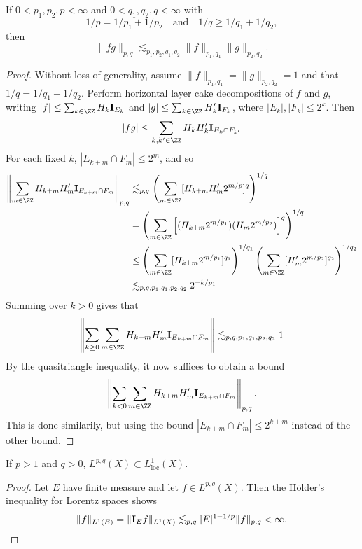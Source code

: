 \begin{theorem}
    If $0 < p_1,p_2,p < \infty$ and $0 < q_1,q_2,q < \infty$ with
    \[ 1/p = 1/p_1 + 1/p_2 \quad \text{and} \quad 1/q \geq 1/q_1 + 1/q_2, \]
    then
    \[ \| f g \|_{p,q} \lesssim_{p_1,p_2,q_1,q_2} \| f \|_{p_1,q_1} \| g \|_{p_2,q_2}. \]
\end{theorem}
\begin{proof}
    Without loss of generality, assume $\| f \|_{p_1,q_1} = \| g \|_{p_2, q_2} = 1$ and that $1/q = 1/q_1 + 1/q_2$. Perform horizontal layer cake decompositions of $f$ and $g$, writing $|f| \leq \sum_{k \in \ZZ} H_k \mathbf{I}_{E_k}$ and $|g| \leq \sum_{k \in \ZZ} H_k' \mathbf{I}_{F_k}$, where $|E_k|, |F_k| \leq 2^k$. Then
    \[ |fg| \leq \sum_{k,k' \in \ZZ} H_k H_k' \mathbf{I}_{E_k \cap F_{k'}} \]
    For each fixed $k$, $|E_{k + m} \cap F_m| \leq 2^m$, and so
    \begin{align*}
        \left\| \sum_{m \in \ZZ} H_{k + m} H_m' \mathbf{I}_{E_{k+m} \cap F_m} \right\|_{p,q} &\lesssim_{p,q} \left( \sum_{m \in \ZZ} [H_{k+m} H_m' 2^{m/p}]^q \right)^{1/q}\\
        &= \left( \sum_{m \in \ZZ} \left[ (H_{k+m} 2^{m/p_1}) (H_m 2^{m/p_2}) \right]^q \right)^{1/q}\\
        &\leq \left( \sum_{m \in \ZZ} [H_{k+m} 2^{m/p_1} ]^{q_1} \right)^{1/q_1} \left( \sum_{m \in \ZZ} [H_m' 2^{m/p_2}]^{q_2} \right)^{1/q_2}\\
        &\lesssim_{p,q,p_1,q_1,p_2,q_2} 2^{-k/p_1}\\
    \end{align*}
    Summing over $k > 0$ gives that
    \[ \left\| \sum_{k \geq 0} \sum_{m \in \ZZ} H_{k+m} H_m' \mathbf{I}_{E_{k+m} \cap F_m} \right\| \lesssim_{p,q,p_1,q_1,p_2,q_2} 1 \]
    By the quasitriangle inequality, it now suffices to obtain a bound
    \[ \left\| \sum_{k < 0} \sum_{m \in \ZZ} H_{k+m} H_m' \mathbf{I}_{E_{k+m} \cap F_m} \right\|_{p,q}. \]
    This is done similarily, but using the bound $|E_{k+m} \cap F_m| \leq 2^{k+m}$ instead of the other bound.
\end{proof}

\begin{corollary}
    If $p > 1$ and $q > 0$, $L^{p,q}(X) \subset L^1_{\text{loc}}(X)$.
\end{corollary}
\begin{proof}
    Let $E$ have finite measure and let $f \in L^{p,q}(X)$. Then the H\"{o}lder's inequality for Lorentz spaces shows
    \[ \| f \|_{L^1(E)} = \| \mathbf{I}_E f \|_{L^1(X)} \lesssim_{p,q} |E|^{1 - 1/p} \| f \|_{p,q} < \infty. \qedhere \]
\end{proof}

